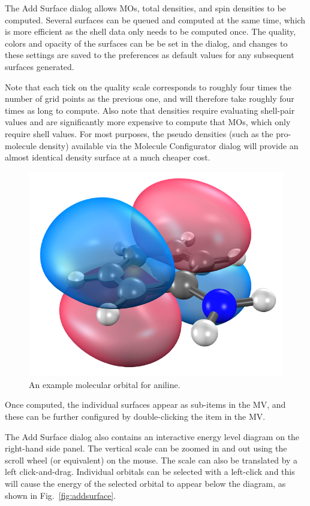 \documentclass[a4paper,12pt]{article}
\begin{document}
The Add Surface dialog allows MOs, total densities, and spin densities  to be
computed.  Several surfaces can be queued and computed at the same time, which
is more efficient as the shell data only needs to be computed once.  The
quality, colors and opacity of the surfaces can be be set in the dialog, and
changes to these settings are saved to the preferences as default values for
any subsequent surfaces generated.

Note that each tick on the quality scale corresponds to roughly four times the
number of grid points as the previous one, and will therefore take roughly four
times as long to compute.  Also note that densities require evaluating
shell-pair values and are significantly more expensive to compute that MOs,
which only require shell values.  For most purposes, the pseudo densities (such
as the pro-molecule density) available via the Molecule Configurator dialog will
provide an almost identical density surface at a much cheaper cost.

\begin{figure}[h]
\begin{center}
\includegraphics[scale=0.32]{figures/Orbital.png}
\caption{An example molecular orbital for aniline.}
\label{fig:mo}
\end{center}
\end{figure}

Once computed, the individual surfaces appear as sub-items in the MV, and these
can be further configured by double-clicking the item in the MV.

The Add Surface dialog also contains an interactive energy level diagram on the
right-hand side panel.  The vertical scale can be zoomed in and out using the
scroll wheel (or equivalent) on the mouse.  The scale can also be translated by
a left click-and-drag.  Individual orbitals can be selected with a left-click
and this will cause the energy of the selected orbital to appear below the
diagram, as shown in Fig.~\ref{fig:addsurface}.
\end{document}
